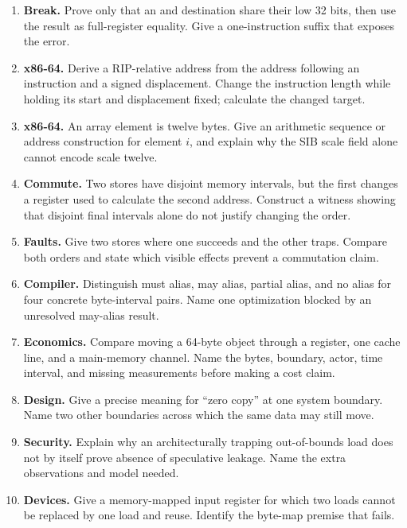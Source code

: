 \begin{enumerate}
\item \textbf{Break.} Prove only that an  and  destination
share their low 32 bits, then use the result as full-register equality. Give a
one-instruction suffix that exposes the error.

\item \textbf{x86-64.} Derive a RIP-relative address from the address following
an instruction and a signed displacement. Change the instruction length while
holding its start and displacement fixed; calculate the changed target.

\item \textbf{x86-64.} An array element is twelve bytes. Give an arithmetic
sequence or address construction for element \(i\), and explain why the SIB
scale field alone cannot encode scale twelve.

\item \textbf{Commute.} Two stores have disjoint memory intervals, but the
first changes a register used to calculate the second address. Construct a
witness showing that disjoint final intervals alone do not justify changing the order.

\item \textbf{Faults.} Give two stores where one succeeds and the other traps.
Compare both orders and state which visible effects prevent a commutation claim.

\item \textbf{Compiler.} Distinguish must alias, may alias, partial alias, and
no alias for four concrete byte-interval pairs. Name one optimization blocked
by an unresolved may-alias result.

\item \textbf{Economics.} Compare moving a 64-byte object through a register,
one cache line, and a main-memory channel. Name the bytes, boundary, actor,
time interval, and missing measurements before making a cost claim.

\item \textbf{Design.} Give a precise meaning for ``zero copy'' at one system
boundary. Name two other boundaries across which the same data may still move.

\item \textbf{Security.} Explain why an architecturally trapping out-of-bounds
load does not by itself prove absence of speculative leakage. Name the extra
observations and model needed.

\item \textbf{Devices.} Give a memory-mapped input register for which two loads
cannot be replaced by one load and reuse. Identify the byte-map premise that
fails.


\end{enumerate}
